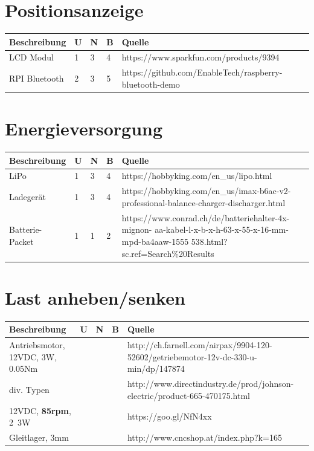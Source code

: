 \documentclass[a4paper]{report}
\begin{document}
\section{Positionsanzeige}
\vspace{1em}
\noindent
\begin{tabular}{|p{}|p{}|p{}|p{}|p{}|}
	\hline
	\textbf{Beschreibung} & \textbf{U} & \textbf{N} & \textbf{B} & \textbf{Quelle} \\
	\hline
	LCD Modul & 1 & 3 & 4 & https://www.sparkfun.com/products/9394 \\
	\hline
	RPI Bluetooth & 2 & 3 & 5 & https://github.com/EnableTech/raspberry-bluetooth-demo \\
	\hline
\end{tabular}

\section{Energieversorgung}
\vspace{1em}
\noindent
\begin{tabular}{|p{}|p{}|p{}|p{}|p{}|}
	\hline
	\textbf{Beschreibung} & \textbf{U} & \textbf{N} & \textbf{B} & \textbf{Quelle} \\
	\hline
	LiPo & 1 & 3 & 4 & https://hobbyking.com/en\_us/lipo.html \\
	\hline
	Ladegerät & 1 & 3 & 4 & https://hobbyking.com/en\_us/imax-b6ac-v2-professional-balance-charger-discharger.html \\
	\hline
	Batterie-Packet & 1 & 1 & 2 & https://www.conrad.ch/de/batteriehalter-4x-mignon-
	aa-kabel-l-x-b-x-h-63-x-55-x-16-mm-mpd-ba4aaw-1555
	538.html?sc.ref=Search\%20Results
	\\
	\hline
\end{tabular}

\section{Last anheben/senken}
\begin{tabular}{|p{}|p{}|p{}|p{}|p{}|}
	\hline
	\textbf{Beschreibung} & \textbf{U} & \textbf{N} & \textbf{B} & \textbf{Quelle} \\
	\hline
	Antriebsmotor, 12VDC, 3W, 0.05Nm & & & &
	http://ch.farnell.com/airpax/9904-120-52602/getriebemotor-12v-dc-330-u-min/dp/147874  \\
	\hline
	div. Typen & & & & http://www.directindustry.de/prod/johnson-electric/product-665-470175.html\\
	\hline
	12VDC, \textbf{85rpm}, 2~3W & & & & https://goo.gl/NfN4xx\\
	\hline
	Gleitlager, 3mm & & & & http://www.cncshop.at/index.php?k=165\\
	\hline
\end{tabular}
\end{document}
